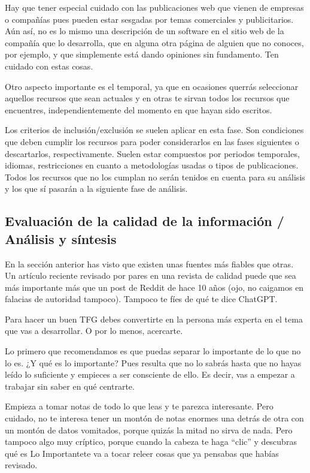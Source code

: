 Hay que tener especial cuidado con las publicaciones web que vienen de empresas o compañías pues pueden estar sesgadas por temas comerciales y publicitarios. Aún así, no es lo mismo una descripción de un software en el sitio web de la compañía que lo desarrolla, que en alguna otra página de alguien que no conoces, por ejemplo, y que simplemente está dando opiniones sin fundamento. Ten cuidado con estas cosas.  

Otro aspecto importante es el temporal, ya que en ocasiones querrás seleccionar aquellos recursos que sean actuales y en otras te sirvan todos los recursos que encuentres, independientemente del momento en que hayan sido escritos. 

Los criterios de inclusión/exclusión se suelen aplicar en esta fase. Son condiciones que deben cumplir los recursos para poder considerarlos en las fases siguientes o descartarlos, respectivamente. Suelen estar compuestos por periodos temporales, idiomas, restricciones en cuanto a metodologías usadas o tipos de publicaciones. Todos los recursos que no los cumplan no serán tenidos en cuenta para su análisis y los que sí pasarán a la siguiente fase de análisis.

\subsection{Evaluación de la calidad de la información / Análisis y síntesis}

En la sección anterior has visto que existen unas fuentes más fiables que otras. Un artículo reciente revisado por pares en una revista de calidad puede que sea más importante más que un post de Reddit de hace 10 años (ojo, no caigamos en falacias de autoridad tampoco). Tampoco te fíes de qué te dice ChatGPT.

Para hacer un buen TFG debes convertirte en la persona más experta en el tema que vas a desarrollar. O por lo menos, acercarte.

Lo primero que recomendamos es que puedas separar lo importante de lo que no lo es. ¿Y qué es lo importante?  Pues resulta que no lo sabrás hasta que no hayas leído lo suficiente y empieces a ser consciente de ello. Es decir, vas a empezar a trabajar sin saber en qué centrarte.

Empieza a tomar notas de todo lo que leas y te parezca interesante. Pero cuidado, no te interesa tener un montón de notas enormes una detrás de otra con un montón de datos vomitados, porque quizás la mitad no sirva de nada. Pero tampoco algo muy críptico, porque cuando la cabeza te haga ``clic'' y descubras qué es Lo Importante\texttrademark  te va a tocar releer cosas que ya pensabas que habías revisado. 

